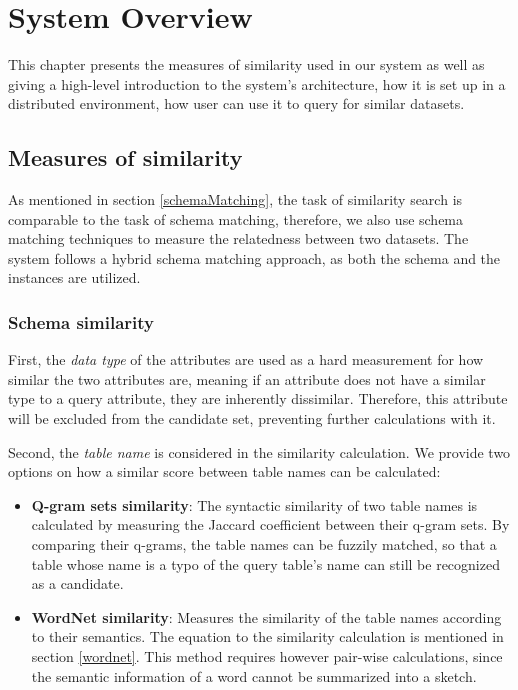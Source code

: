 


\chapter{System Overview}
\label{chap:overview}
\pagestyle{plain}

This chapter presents the measures of similarity used in our system as well as giving a high-level introduction to the system's architecture, how it is set up in a distributed environment, how user can use it to query for similar datasets.

\section{Measures of similarity}\label{simMeasures}

As mentioned in section \ref{schemaMatching}, the task of similarity search is comparable to the task of schema matching, therefore, we also use schema matching techniques to measure the relatedness between two datasets. The system follows a hybrid schema matching approach, as both the schema and the instances are utilized.

\subsection{Schema similarity}\label{schemaSim}

First, the \textit{data type} of the attributes are used as a hard measurement for how similar the two attributes are, meaning if an attribute does not have a similar type to a query attribute, they are inherently dissimilar. Therefore, this attribute will be excluded from the candidate set, preventing further calculations with it.

Second, the \textit{table name} is considered in the similarity calculation. We provide two options on how a similar score between table names can be calculated:

\begin{itemize}
    \item \textbf{Q-gram sets similarity}: The syntactic similarity of two table names is calculated by measuring the Jaccard coefficient between their q-gram sets. By comparing their q-grams, the table names can be fuzzily matched, so that a table whose name is a typo of the query table's name can still be recognized as a candidate.
    \item \textbf{WordNet similarity}: Measures the similarity of the table names according to their semantics. The equation to the similarity calculation is mentioned in section \ref{wordnet}. This method requires however pair-wise calculations, since the semantic information of a word cannot be summarized into a sketch.
\end{itemize}

